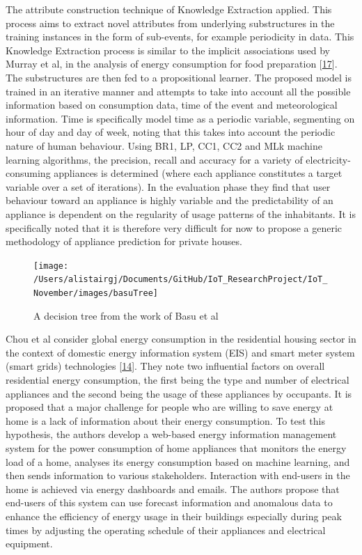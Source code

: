 \documentclass[11pt,]{article}
\begin{document}
The attribute construction technique of Knowledge Extraction applied.
This process aims to extract novel attributes from underlying
substructures in the training instances in the form of sub-events, for
example periodicity in data. This Knowledge Extraction process is
similar to the implicit associations used by Murray et al, in the
analysis of energy consumption for food preparation
{[}\protect\hyperlink{ref-d.m.murrayApplianceElectricalConsumption2018}{17}{]}.
The substructures are then fed to a propositional learner. The proposed
model is trained in an iterative manner and attempts to take into
account all the possible information based on consumption data, time of
the event and meteorological information. Time is specifically model
time as a periodic variable, segmenting on hour of day and day of week,
noting that this takes into account the periodic nature of human
behaviour. Using BR1, LP, CC1, CC2 and MLk machine learning algorithms,
the precision, recall and accuracy for a variety of
electricity-consuming appliances is determined (where each appliance
constitutes a target variable over a set of iterations). In the
evaluation phase they find that user behaviour toward an appliance is
highly variable and the predictability of an appliance is dependent on
the regularity of usage patterns of the inhabitants. It is specifically
noted that it is therefore very difficult for now to propose a generic
methodology of appliance prediction for private houses.

\begin{figure}[H]

{\centering \texttt{[image: /Users/alistairgj/Documents/GitHub/IoT\_ResearchProject/IoT\_November/images/basuTree]} 

}

\caption{A decision tree from the work of Basu et al}\label{fig:unnamed-chunk-3}
\end{figure}

Chou et al consider global energy consumption in the residential housing
sector in the context of domestic energy information system (EIS) and
smart meter system (smart grids) technologies
{[}\protect\hyperlink{ref-jui-shengchouCloudForecastingSystem2019}{14}{]}.
They note two influential factors on overall residential energy
consumption, the first being the type and number of electrical
appliances and the second being the usage of these appliances by
occupants. It is proposed that a major challenge for people who are
willing to save energy at home is a lack of information about their
energy consumption. To test this hypothesis, the authors develop a
web-based energy information management system for the power consumption
of home appliances that monitors the energy load of a home, analyses its
energy consumption based on machine learning, and then sends information
to various stakeholders. Interaction with end-users in the home is
achieved via energy dashboards and emails. The authors propose that
end-users of this system can use forecast information and anomalous data
to enhance the efficiency of energy usage in their buildings especially
during peak times by adjusting the operating schedule of their
appliances and electrical equipment.
\end{document}
